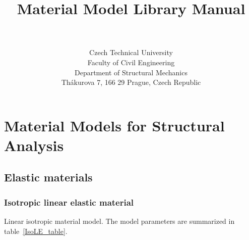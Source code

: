 \documentclass[a4paper]{article}
\begin{document}
\title{
\ifpdf
{}
\else
{}
\fi
Material Model Library Manual}
\author{\bp \\ \\
Czech Technical University\\
Faculty of Civil Engineering\\
Department of Structural Mechanics\\
Th\'akurova 7, 166 29 Prague, Czech Republic
}
\maketitle

\newpage
\tableofcontents
\listoftables
\newpage
\section{Material Models for Structural Analysis}
\subsection{Elastic materials}
\subsubsection{Isotropic linear elastic material}
\label{IsoLE}
Linear isotropic material model. The model parameters are summarized
in table~\ref{IsoLE_table}.
\end{document}
